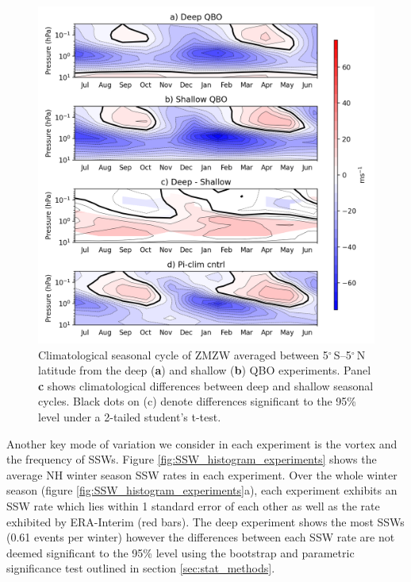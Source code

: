 \begin{figure}[h!]
\begin{center}
\noindent\includegraphics[width = 0.75\linewidth]{Figures/Figures-deepQBO/SAO_seasonal_cycles.png}
\caption[Climatological seasonal cycle of equatorial ZMZW in QBO experiments]{Climatological seasonal cycle of ZMZW averaged between 5$^{\circ}$\,S--5$^{\circ}$\,N latitude from the deep (\textbf{a}) and shallow (\textbf{b}) QBO experiments. Panel \textbf{c} shows climatological differences between deep and shallow seasonal cycles. Black dots on (c) denote differences significant to the 95\% level under a 2-tailed student's t-test.}
\label{fig:experiment_SAOs}
\end{center}
\end{figure}

Another key mode of variation we consider in each experiment is the vortex and the frequency of SSWs. Figure \ref{fig:SSW_histogram_experiments} shows the average NH winter season SSW rates in each experiment. Over the whole winter season (figure \ref{fig:SSW_histogram_experiments}a), each experiment exhibits an SSW rate which lies within 1 standard error of each other as well as the rate exhibited by ERA-Interim (red bars). The deep experiment shows the most SSWs (0.61 events per winter) however the differences between each SSW rate are not deemed significant to the 95\% level using the bootstrap and parametric significance test outlined in section \ref{sec:stat_methods}. 

